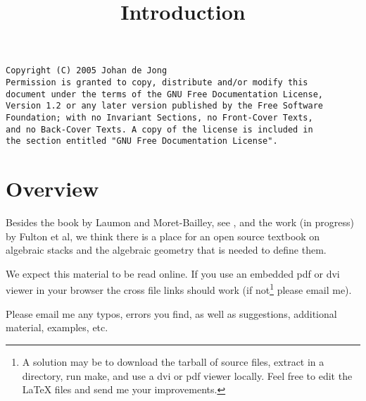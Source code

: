 

%


\title{Introduction}


\maketitle

\begin{verbatim}
Copyright (C) 2005 Johan de Jong
Permission is granted to copy, distribute and/or modify this
document under the terms of the GNU Free Documentation License,
Version 1.2 or any later version published by the Free Software
Foundation; with no Invariant Sections, no Front-Cover Texts,
and no Back-Cover Texts. A copy of the license is included in
the section entitled "GNU Free Documentation License".
\end{verbatim}

\tableofcontents

\section{Overview}
\label{section-overview}

\noindent
Besides the book by Laumon and Moret-Bailley, see \cite{LM-B}, and the work
(in progress) by Fulton et al, we think there is a place for an open source
textbook on algebraic stacks and the algebraic geometry that is needed
to define them.

\medskip\noindent
We expect this material to be read online. If you use an
embedded pdf or dvi viewer in your browser the cross file
links should work (if not\footnote{A solution may be
to download the tarball of source files, extract in a directory,
run make, and use a dvi or pdf viewer locally. Feel free to
edit the LaTeX files and send me your improvements.} please email me).

\medskip\noindent
Please email me any typos, errors you find, as well as suggestions,
additional material, examples, etc.








